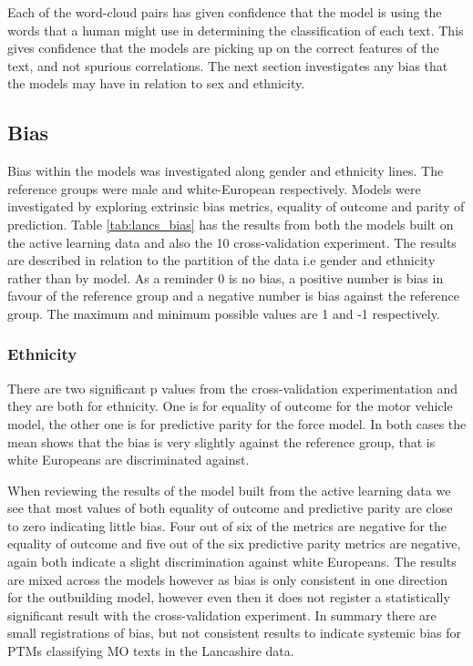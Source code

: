 Each of the word-cloud pairs has given confidence that the model is using the words that a human might use in determining the classification of each text. This gives confidence that the models are picking up on the correct features of the text, and not spurious correlations. The next section investigates any bias that the models may have in relation to sex and ethnicity.

\subsection{Bias} Bias within the models was investigated along gender and ethnicity lines. The reference groups were male and white-European respectively. Models were investigated by exploring extrinsic bias metrics, equality of outcome and parity of prediction. Table \ref{tab:lancs_bias} has the results from both the models built on the active learning data and also the 10 cross-validation experiment. The results are described in relation to the partition of the data i.e gender and ethnicity rather than by model. As a reminder 0 is no bias, a positive number is bias in favour of the reference group and a negative number is bias against the reference group. The maximum and minimum possible values are 1 and -1 respectively.

\subsubsection{Ethnicity} There are two significant p values from the cross-validation experimentation and they are both for ethnicity. One is for equality of outcome for the motor vehicle model, the other one is for predictive parity for the force model. In both cases the mean shows that the bias is very slightly against the reference group, that is white Europeans are discriminated against. 

When reviewing the results of the model built from the active learning data we see that most values of both equality of outcome and predictive parity are close to zero indicating little bias. Four out of six of the metrics are negative for the equality of outcome and five out of the six predictive parity metrics are negative, again both indicate a slight discrimination against white Europeans. The results are mixed across the models however as bias is only consistent in one direction for the outbuilding model, however even then it does not register a statistically significant result with the cross-validation experiment. In summary there are small registrations of bias, but not consistent results to indicate systemic bias for PTMs classifying MO texts in the Lancashire data.
 

